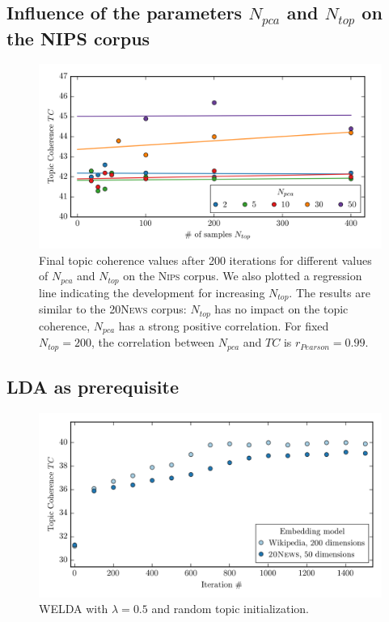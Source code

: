 \documentclass[
        a4paper,
        titlepage,
        twoside,
        parskip,
        numbers=noenddot
        ]{scrbook}
\theoremstyle{break}
\begin{document}
\begin{appendices}
  \subsection{Influence of the parameters $N_{pca}$ and $N_{top}$ on the N{\footnotesize IPS} corpus}
  \label{sec:appendix_welda_gaussian_nips_pca_samples}

  \begin{figure}[H]
         \centering
         \includegraphics[width=\textwidth]{figures/welda_gaussian_nips_pca_samples.png}
         \caption{Final topic coherence values after 200 iterations for different values of $N_{pca}$ and $N_{top}$ on the \textsc{Nips} corpus. We also plotted a regression line indicating the development for increasing $N_{top}$. The results are similar to the \textsc{20News} corpus: $N_{top}$ has no impact on the topic coherence, $N_{pca}$ has a strong positive correlation. For fixed $N_{top} = 200$, the correlation between $N_{pca}$ and $TC$ is $r_{Pearson} = 0.99$.}
         \label{fig:welda_gaussian_nips_pca_samples}
  \end{figure}

  \subsection{LDA as prerequisite}
  \label{sec:appendix_lda_prerequisite}
  \begin{figure}[H]
         \centering
         \includegraphics[width=\textwidth]{figures/welda_gaussian_random_init.png}
         \caption{WELDA with $\lambda = 0.5$ and random topic initialization. }
         \label{fig:standard_lda_as_prerequisite}
  \end{figure}


\end{appendices}
\end{document}
